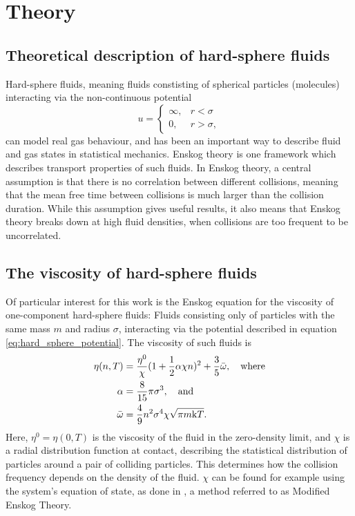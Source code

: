 \section{Theory}
\label{sec:theory}
\subsection{Theoretical description of hard-sphere fluids}
Hard-sphere fluids, meaning fluids constisting of spherical particles (molecules) interacting via the non-continuous potential 
\begin{equation}
    \label{eq:hard_sphere_potential}
    u = 
    \begin{cases}
        \infty, & r < \sigma \\
        0, & r > \sigma,
    \end{cases}
\end{equation}
can model real gas behaviour, and has been an important way to describe fluid and gas states in statistical mechanics.
Enskog theory is one framework which describes transport properties of such fluids.
In Enskog theory, a central assumption is that there is no correlation between different collisions,
meaning that the mean free time between collisions is much larger than the collision duration.
While this assumption gives useful results, it also means that Enskog theory breaks down at high fluid densities,
when collisions are too frequent to be uncorrelated.

\subsection{The viscosity of hard-sphere fluids}
Of particular interest for this work is the Enskog equation 
for the viscosity of one-component hard-sphere fluids:
Fluids consisting only of particles with the same mass $m$ and radius $\sigma$, 
interacting via the potential described in equation \ref{eq:hard_sphere_potential}.
The viscosity of such fluids is \cite{ref:pippo:composition_dependence}
\begin{equation}
    \begin{split}
        \eta(n,T) 
            &= \frac{\eta^0}{\chi} (1+\frac{1}{2} \alpha \chi n)^2 + \frac{3}{5} \bar{\omega}, \quad \text{where}\\
        \alpha 
            &= \frac{8}{15} \pi \sigma^3, \quad \text{and} \\
        \bar{\omega} 
            &= \frac{4}{9} n^2 \sigma^4 \chi \sqrt{\pi m \mathrm{k} T}.
    \end{split}
\end{equation}
Here, $\eta^0 = \eta(0, T)$ is the viscosity of the fluid in the zero-density limit, 
and $\chi$ is a radial distribution function at contact, 
describing the statistical distribution of particles around a pair of colliding particles.
This determines how the collision frequency depends on the density of the fluid.
$\chi$ can be found for example using the system's equation of state, 
as done in \cite{ref:pippo:composition_dependence}, a method referred to as Modified Enskog Theory.

